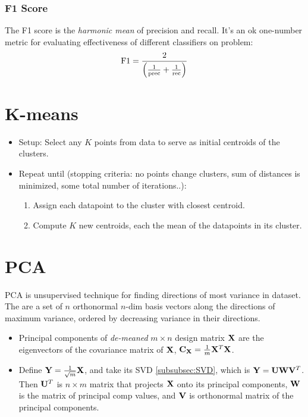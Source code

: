 \documentclass[11pt]{article}
\begin{document}
\subsubsection{F1 Score}
The F1 score is the \emph{harmonic mean} of precision and recall. It's an ok one-number
metric for evaluating effectiveness of different classifiers on problem:
\begin{equation}
  \label{eq:F1}
  \textrm{F1} = \frac{2}{\left(\frac{1}{\textrm{prec}} + \frac{1}{\textrm{rec}}\right)}
\end{equation}



\section{K-means}
\label{sec:kmeans}
\begin{itemize}
  \item Setup: Select any $K$ points from data to serve as initial centroids of the
  clusters.
  \item Repeat until (stopping criteria: \eeg no points change clusters, sum of
  distances is minimized, some total number of iterations..):
  \begin{enumerate}
    \item Assign each datapoint to the cluster with closest centroid.
    \item Compute $K$ new centroids, each the mean of the datapoints in its cluster.
  \end{enumerate}
\end{itemize}



\section{PCA}
\label{sec:pca}
PCA is unsupervised technique for finding directions of most variance in dataset. The
 are a set of $n$ orthonormal $n$-dim basis vectors along
the directions of maximum variance, ordered by decreasing variance in their directions.

\begin{itemize}
  \item {} Principal components of \emph{de-meaned} $m \times n$
  design matrix $\mathbf{X}$ are the eigenvectors of the covariance matrix of $\mathbf{X}$,
  $\mathbf{C_X} = \frac{1}{m} \mathbf{X}^T \mathbf{X}$.
  \item {} Define $\mathbf{Y} = \frac{1}{\sqrt{m}} \mathbf{X}$, and take its SVD
  \ref{subsubsec:SVD}, which is $\mathbf{Y} = \mathbf{U} \mathbf{W} \mathbf{V}^T$. Then $\mathbf{U}^T$ is $n \times m$
  matrix that projects $\mathbf{X}$ onto its principal components, $\mathbf{W}$ is the matrix of
  principal comp values, and $\mathbf{V}$ is orthonormal matrix of the principal
  components. 
\end{itemize}
\end{document}
